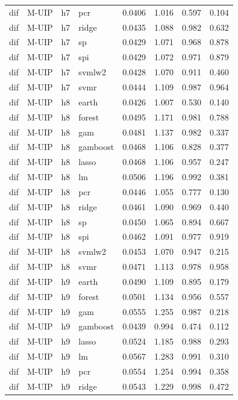 \begin{ThreePartTable}
\begin{longtable}[t]{llclcccc}
dif & M-UIP & h7 & pcr & 0.0406 & 1.016 & 0.597 & 0.104\\
dif & M-UIP & h7 & ridge & 0.0435 & 1.088 & 0.982 & 0.632\\
dif & M-UIP & h7 & sp & 0.0429 & 1.071 & 0.968 & 0.878\\
dif & M-UIP & h7 & spi & 0.0429 & 1.072 & 0.971 & 0.879\\
dif & M-UIP & h7 & svmlw2 & 0.0428 & 1.070 & 0.911 & 0.460\\
dif & M-UIP & h7 & svmr & 0.0444 & 1.109 & 0.987 & 0.964\\
\addlinespace
dif & M-UIP & h8 & earth & 0.0426 & 1.007 & 0.530 & 0.140\\
dif & M-UIP & h8 & forest & 0.0495 & 1.171 & 0.981 & 0.788\\
dif & M-UIP & h8 & gam & 0.0481 & 1.137 & 0.982 & 0.337\\
dif & M-UIP & h8 & gamboost & 0.0468 & 1.106 & 0.828 & 0.377\\
dif & M-UIP & h8 & lasso & 0.0468 & 1.106 & 0.957 & 0.247\\
dif & M-UIP & h8 & lm & 0.0506 & 1.196 & 0.992 & 0.381\\
dif & M-UIP & h8 & pcr & 0.0446 & 1.055 & 0.777 & 0.130\\
dif & M-UIP & h8 & ridge & 0.0461 & 1.090 & 0.969 & 0.440\\
dif & M-UIP & h8 & sp & 0.0450 & 1.065 & 0.894 & 0.667\\
dif & M-UIP & h8 & spi & 0.0462 & 1.091 & 0.977 & 0.919\\
dif & M-UIP & h8 & svmlw2 & 0.0453 & 1.070 & 0.947 & 0.215\\
dif & M-UIP & h8 & svmr & 0.0471 & 1.113 & 0.978 & 0.958\\
\addlinespace
dif & M-UIP & h9 & earth & 0.0490 & 1.109 & 0.895 & 0.179\\
dif & M-UIP & h9 & forest & 0.0501 & 1.134 & 0.956 & 0.557\\
dif & M-UIP & h9 & gam & 0.0555 & 1.255 & 0.987 & 0.218\\
dif & M-UIP & h9 & gamboost & 0.0439 & 0.994 & 0.474 & 0.112\\
dif & M-UIP & h9 & lasso & 0.0524 & 1.185 & 0.988 & 0.293\\
dif & M-UIP & h9 & lm & 0.0567 & 1.283 & 0.991 & 0.310\\
dif & M-UIP & h9 & pcr & 0.0554 & 1.254 & 0.994 & 0.358\\
dif & M-UIP & h9 & ridge & 0.0543 & 1.229 & 0.998 & 0.472\\

\end{longtable}
\end{ThreePartTable}
